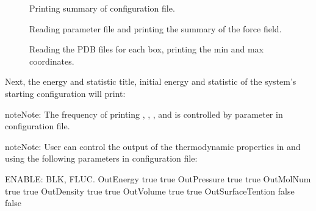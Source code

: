 \documentclass[letterpaper,10pt,english]{sphinxmanual}
\begin{document}
\begin{figure}[htbp]
\centering
\capstart

\noindent{}
\caption{Printing summary of configuration file.}\label{\detokenize{output_file:id1}}\end{figure}

\begin{figure}[htbp]
\centering
\capstart

\noindent{}
\caption{Reading parameter file and printing the summary of the force field.}\label{\detokenize{output_file:id2}}\end{figure}

\begin{figure}[htbp]
\centering
\capstart

\noindent{}
\caption{Reading the PDB files for each box, printing the min and max coordinates.}\label{\detokenize{output_file:id3}}\end{figure}

Next, the energy and statistic title, initial energy and statistic of the system’s starting configuration will print:

\begin{sphinxadmonition}{note}{Note:}
The frequency of printing , , , and  is controlled by 
parameter in configuration file.
\end{sphinxadmonition}

\begin{sphinxadmonition}{note}{Note:}
User can control the output of the thermodynamic properties in  and  using the following
parameters in configuration file:

\begin{sphinxVerbatim}[commandchars=\\\{\}]
\PYGZsh{}\PYGZsh{}\PYGZsh{}\PYGZsh{}\PYGZsh{}\PYGZsh{}\PYGZsh{}\PYGZsh{}\PYGZsh{}\PYGZsh{}\PYGZsh{}\PYGZsh{}\PYGZsh{}\PYGZsh{}\PYGZsh{}\PYGZsh{}\PYGZsh{}\PYGZsh{}\PYGZsh{}\PYGZsh{}\PYGZsh{}\PYGZsh{}\PYGZsh{}\PYGZsh{}\PYGZsh{}\PYGZsh{}\PYGZsh{}\PYGZsh{}\PYGZsh{}\PYGZsh{}\PYGZsh{}\PYGZsh{}\PYGZsh{}
\PYGZsh{} ENABLE:         BLK, FLUC.
\PYGZsh{}\PYGZsh{}\PYGZsh{}\PYGZsh{}\PYGZsh{}\PYGZsh{}\PYGZsh{}\PYGZsh{}\PYGZsh{}\PYGZsh{}\PYGZsh{}\PYGZsh{}\PYGZsh{}\PYGZsh{}\PYGZsh{}\PYGZsh{}\PYGZsh{}\PYGZsh{}\PYGZsh{}\PYGZsh{}\PYGZsh{}\PYGZsh{}\PYGZsh{}\PYGZsh{}\PYGZsh{}\PYGZsh{}\PYGZsh{}\PYGZsh{}\PYGZsh{}\PYGZsh{}\PYGZsh{}\PYGZsh{}\PYGZsh{}
OutEnergy         true  true
OutPressure       true  true
OutMolNum         true  true
OutDensity        true  true
OutVolume         true  true
OutSurfaceTention false false
\end{sphinxVerbatim}
\end{sphinxadmonition}
\end{document}
